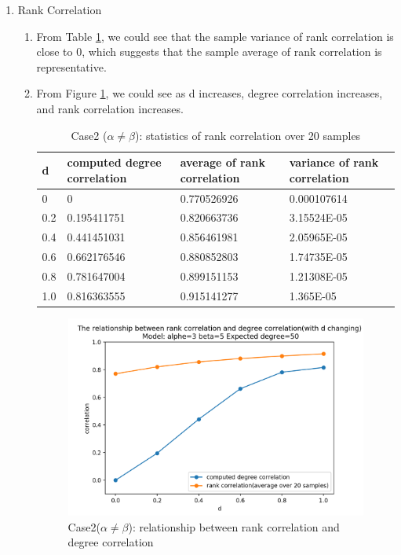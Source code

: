 \documentclass{article}
\begin{document}
\begin{enumerate}
\item Rank Correlation
\begin{enumerate}

\item From Table \ref{table2}, we could see that the sample variance of rank correlation is close to 0, which suggests that the sample average of rank correlation is representative.
\item From Figure \ref{fig: corrs_2}, we could see as d increases,  degree correlation increases, and rank correlation increases.
\begin{table}[]
\centering
\caption{Case2 ($\alpha \neq \beta$): statistics of rank correlation over 20 samples}
\label{table2}
\begin{tabular}{|l|l|l|l|}
\hline
d   & computed degree correlation & average of rank correlation & variance of rank correlation \\
\hline
0   & 0                           & 0.770526926                            & 0.000107614 \\
\hline
0.2 & 0.195411751                & 0.820663736                            & 3.15524E-05 \\
\hline
0.4 &0.441451031                &0.856461981                            & 2.05965E-05
 \\
\hline
0.6 & 0.662176546                 & 0.880852803                         & 1.74735E-05
 \\
\hline
0.8 &0.781647004                & 0.899151153                           & 1.21308E-05
 \\
\hline
1.0 & 0.816363555                 & 0.915141277                             & 1.365E-05
\\
\hline
\end{tabular}
\end{table}


\begin{figure}
\includegraphics[scale=1]{final_images/case2_corrs_relation.png}
\caption{Case2($\alpha \neq \beta$): relationship between rank correlation and degree correlation}
\label{fig: corrs_2}
\end{figure}

\end{enumerate}

\end{enumerate}
\end{document}
